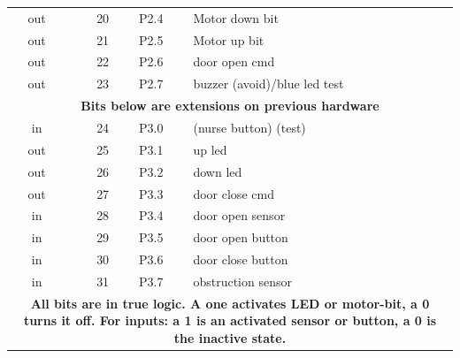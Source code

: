 \begin{table}[htbp]
{\begin{tabular}{crcl}
      out & 20 & P2.4 & Motor down bit       \\
      out & 21 & P2.5 & Motor up bit     \\
      out & 22 & P2.6 & door open cmd     \\
      out & 23 & P2.7 & buzzer (avoid)/blue led test   \\\hline\hline
\multicolumn{4}{c}{\textbf{Bits below are extensions on previous hardware}}\\\hline
      in  & 24 & P3.0 & (nurse button) (test)\\
      out & 25 & P3.1 & up led    \\
      out & 26 & P3.2 & down led   \\
      out & 27 & P3.3 & door close cmd \\\hline

      in  & 28 & P3.4 & door open sensor  \\
      in  & 29 & P3.5 & door open button \\
      in  & 30 & P3.6 & door close button \\
      in  & 31 & P3.7 & obstruction sensor \\\hline

\multicolumn{4}{p{80mm}}{\textbf{All bits are in true logic. A one
    activates LED or motor-bit, a 0 turns it off. For inputs: a 1 is
    an activated 
    sensor or button, a 0 is the inactive state.}}\\\hline
    \end{tabular}
  }
\end{table}

